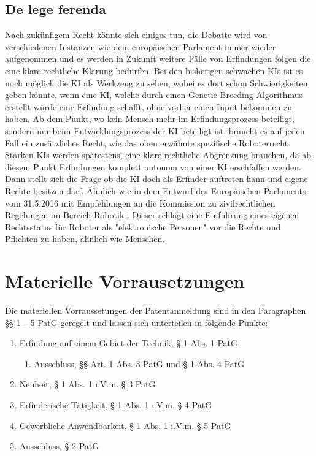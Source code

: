 \subsection{De lege ferenda}
Nach zukünfigem Recht könnte sich einiges tun, die Debatte wird von verschiedenen 
Instanzen wie dem europäischen Parlament immer wieder aufgenommen und es 
werden in Zukunft weitere Fälle von Erfindungen folgen die eine klare rechtliche 
Klärung bedürfen. 
Bei den bisherigen schwachen KIs ist es noch möglich die KI als Werkzeug
zu sehen, wobei es dort schon Schwierigkeiten geben könnte, wenn eine KI,
welche durch einen Genetic Breeding Algorithmus erstellt würde eine Erfindung
schafft, ohne vorher einen Input bekommen zu haben.
Ab dem Punkt, wo kein Mensch mehr im Erfindungsprozess beteiligt,
sondern nur beim Entwicklungsprozess der KI beteiligt ist,
braucht es auf jeden Fall ein zusätzliches Recht, wie das 
oben erwähnte spezifische Roboterrecht.
Starken KIs werden spätestens, eine klare rechtliche Abgrenzung 
brauchen, 
da ab diesem Punkt Erfindungen komplett autonom von einer KI erschfaffen werden.
Dann stellt sich die Frage ob die KI doch als Erfinder auftreten kann 
und eigene Rechte besitzen darf. Ähnlich wie in dem Entwurf des Europäischen
Parlaments vom 31.5.2016 mit Empfehlungen an die Kommission zu zivilrechtlichen Regelungen im
Bereich Robotik \cite{delvauxMitEmpfehlungenKommission}. Dieser schlägt 
eine Einführung eines eigenen Rechtsstatus 
für Roboter als "elektronische Personen" vor die Rechte und Pflichten zu haben, 
ähnlich wie Menschen.
\\
\section{Materielle Vorrausetzungen}

Die materiellen Vorraussetungen der Patentanmeldung sind 
in den Paragraphen §§ 1 – 5 PatG geregelt 
und lassen sich unterteilen in folgende Punkte:

\begin{enumerate}
    \item Erfindung auf einem Gebiet der Technik, § 1 Abs. 1 PatG
    \begin{enumerate}
    \vspace{-0.05in}
    \item Ausschluss, §§ Art. 1 Abs. 3 PatG und § 1 Abs. 4 PatG
    \end{enumerate}
    \vspace{-0.11in} 
    \item Neuheit, § 1 Abs. 1 i.V.m. § 3 PatG
    \vspace{-0.11in} 
    \item Erfinderische Tätigkeit, § 1 Abs. 1 i.V.m. § 4 PatG
    \vspace{-0.11in} 
    \item Gewerbliche Anwendbarkeit, § 1 Abs. 1 i.V.m. § 5 PatG
    \vspace{-0.11in} 
    \item Ausschluss, § 2 PatG
\end{enumerate}

